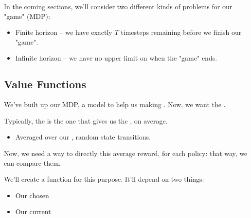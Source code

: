         In the coming sections, we'll consider two different kinds of problems for our "game" (MDP):

        \begin{itemize}
            \item Finite horizon -- we have exactly $T$ timesteps remaining before we finish our "game".
            \item Infinite horizon -- we have no upper limit on when the "game" ends.
        \end{itemize}


    \pagebreak

    \subsection{Value Functions}

        We've built up our MDP, a model to help us making . Now, we want the .\\

        \begin{concept}
            Typically, the  is the one that gives us the , on average.

            \begin{itemize}
                \item Averaged over our , random state transitions.
            \end{itemize}
        \end{concept}

        Now, we need a way to directly  this average reward, for each policy: that way, we can compare them.

        We'll create a function for this purpose. It'll depend on two things:

        \begin{itemize}
            \item Our chosen 
            \item Our current 
        \end{itemize}

